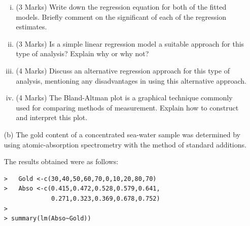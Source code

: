 \documentclass[a4paper,12pt]{article}
\begin{document}
\begin{itemize}
\begin{enumerate}[(i)]
	\item (3 Marks) Write down the regression equation for both of the fitted models. Briefly comment on the significant of each of the regression estimates.
	\item (3 Marks) Is a simple linear regression model a suitable approach for this type of analysis? Explain why or why not? 
	\item (4 Marks) Discuss an alternative regression approach for this type of analysis, mentioning any disadvantages in using this alternative approach. 
	\item (4 Marks) The Bland-Altman plot is a graphical technique	commonly used for comparing methods of measurement. Explain how to construct and interpret this plot.
\end{enumerate}

\newpage
\item[(b)] The gold content of a concentrated sea-water sample was determined by using
atomic-absorption spectrometry with the method of standard additions.

The results obtained were as follows:


\begin{framed}
	\begin{verbatim}
>	Gold <-c(30,40,50,60,70,0,10,20,80,70)
>	Abso <-c(0.415,0.472,0.528,0.579,0.641,	
			 0.271,0.323,0.369,0.678,0.752)
>
> summary(lm(Abso~Gold))


\end{verbatim}
\end{framed}
\end{itemize}
\end{document}
